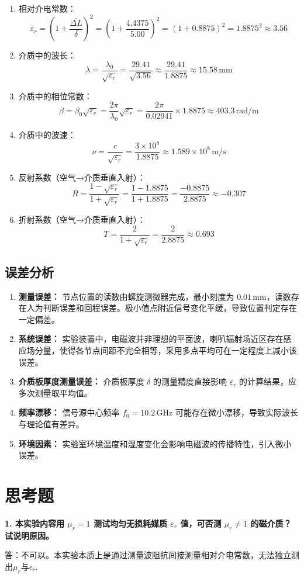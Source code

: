 \documentclass{../ElectromagneticFieldTemplate}
\begin{document}
\begin{enumerate}
    \item 相对介电常数：
    \[
    \varepsilon_r = \left(1 + \frac{\overline{\Delta L}}{\delta}\right)^2 = \left(1 + \frac{4.4375}{5.00}\right)^2 = (1 + 0.8875)^2 = 1.8875^2 \approx 3.56
    \]

    \item 介质中的波长：
    \[
    \lambda = \frac{\lambda_0}{\sqrt{\varepsilon_r}} = \frac{29.41}{\sqrt{3.56}} \approx \frac{29.41}{1.8875} \approx 15.58\,\text{mm}
    \]

    \item 介质中的相位常数：
    \[
    \beta = \beta_0 \sqrt{\varepsilon_r} = \frac{2\pi}{\lambda_0} \sqrt{\varepsilon_r} = \frac{2\pi}{0.02941} \times 1.8875 \approx 403.3\,\text{rad/m}
    \]

    \item 介质中的波速：
    \[
    \nu = \frac{c}{\sqrt{\varepsilon_r}} = \frac{3 \times 10^8}{1.8875} \approx 1.589 \times 10^8\,\text{m/s}
    \]

    \item 反射系数（空气→介质垂直入射）：
    \[
    R = \frac{1 - \sqrt{\varepsilon_r}}{1 + \sqrt{\varepsilon_r}} = \frac{1 - 1.8875}{1 + 1.8875} = \frac{-0.8875}{2.8875} \approx -0.307
    \]

    \item 折射系数（空气→介质垂直入射）：
    \[
    T = \frac{2}{1 + \sqrt{\varepsilon_r}} = \frac{2}{2.8875} \approx 0.693
    \]
\end{enumerate}

\subsection{误差分析}

\begin{enumerate}
    \item \textbf{测量误差：} 节点位置的读数由螺旋测微器完成，最小刻度为 \(0.01\,\text{mm}\)，读数存在人为判断误差和回程误差。极小值点附近信号变化平缓，导致位置判定存在一定偏差。
    \item \textbf{系统误差：} 实验装置中，电磁波并非理想的平面波，喇叭辐射场近区存在感应场分量，使得各节点间距不完全相等，采用多点平均可在一定程度上减小该误差。
    \item \textbf{介质板厚度测量误差：} 介质板厚度 \(\delta\) 的测量精度直接影响 \(\varepsilon_r\) 的计算结果，应多次测量取平均值。
    \item \textbf{频率漂移：} 信号源中心频率 \(f_0 = 10.2\,\text{GHz}\) 可能存在微小漂移，导致实际波长与理论值有差异。
    \item \textbf{环境因素：} 实验室环境温度和湿度变化会影响电磁波的传播特性，引入微小误差。
\end{enumerate}

\section{思考题}

\textbf{1. 本实验内容用 \(\mu_r = 1\) 测试均匀无损耗媒质 \(\varepsilon_r\) 值，可否测 \(\mu_r \neq 1\) 的磁介质？试说明原因。}

答：不可以。本实验本质上是通过测量波阻抗间接测量相对介电常数，无法独立测出\(\mu_r\)与\(\epsilon_r\).
\end{document}
